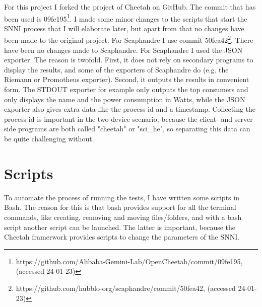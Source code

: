 \documentclass[../thesis.tex]{subfiles}
\begin{document}
For this project I forked the project of Cheetah on GitHub. The commit that has been used is 09fe195\footnote{https://github.com/Alibaba-Gemini-Lab/OpenCheetah/commit/09fe195,  (accessed 24-01-23)}. I made some minor changes to the scripts that start the SNNI process that I will elaborate later, but apart from that no changes have been made to the original project. For Scaphandre I use commit 50fea42\footnote{https://github.com/hubblo-org/scaphandre/commit/50fea42, (accessed 24-01-23)}. There have been no changes made to Scaphandre. For Scaphandre I used the JSON exporter. The reason is twofold. First, it does not rely on secondary programs to display the results, and some of the exporters of Scaphandre do (e.g. the Riemann or Promotheus exporter). Second, it outputs the results in convenient form. The STDOUT exporter for example only outputs the top consumers and only displays the name and the power consumption in Watts, while the JSON exporter also gives extra data like the process id and a timestamp. Collecting the process id is important in the two device scenario, because the client- and server side programs are both called "cheetah" or "sci\_he", so separating this data can be quite challenging without.     

\section{Scripts}
To automate the process of running the tests, I have written some scripts in Bash. The reason for this is that bash provides support for all the terminal commands, like creating, removing and moving files/folders, and with a bash script another script can be launched. The latter is important, because the Cheetah framerwork provides scripts to change the parameters of the SNNI.
\end{document}
